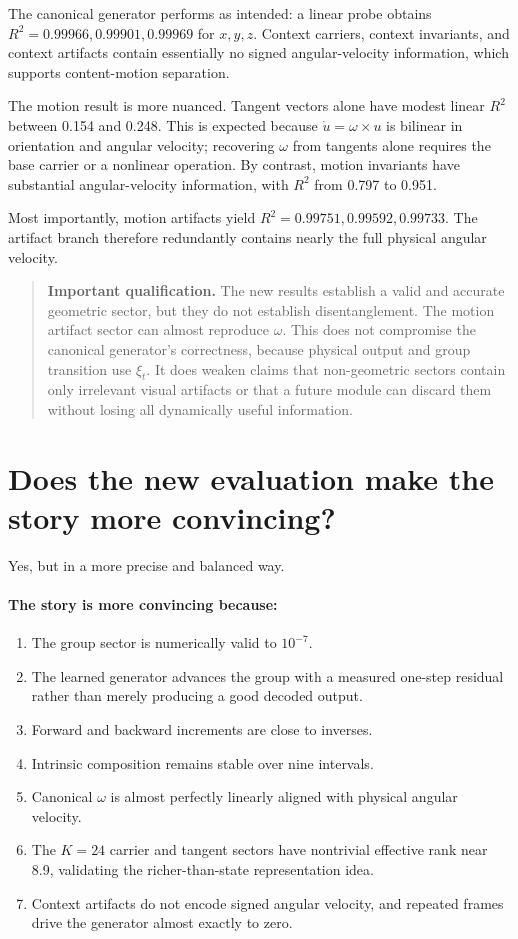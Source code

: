 \documentclass[11pt,a4paper]{article}
\newenvironment{caution}{\begin{quote}\color{reportorange}\textbf{Important qualification.} }{\end{quote}}
\begin{document}
The canonical generator performs as intended: a linear probe obtains $R^2=0.99966,0.99901,0.99969$ for $x,y,z$. Context carriers, context invariants, and context artifacts contain essentially no signed angular-velocity information, which supports content-motion separation.

The motion result is more nuanced. Tangent vectors alone have modest linear $R^2$ between 0.154 and 0.248. This is expected because $\dot u=\omega\times u$ is bilinear in orientation and angular velocity; recovering $\omega$ from tangents alone requires the base carrier or a nonlinear operation. By contrast, motion invariants have substantial angular-velocity information, with $R^2$ from 0.797 to 0.951.

Most importantly, motion artifacts yield $R^2=0.99751,0.99592,0.99733$. The artifact branch therefore redundantly contains nearly the full physical angular velocity.

\begin{caution}
The new results establish a valid and accurate geometric sector, but they do not establish disentanglement. The motion artifact sector can almost reproduce $\omega$. This does not compromise the canonical generator's correctness, because physical output and group transition use $\xi_t$. It does weaken claims that non-geometric sectors contain only irrelevant visual artifacts or that a future module can discard them without losing all dynamically useful information.
\end{caution}

\section{Does the new evaluation make the story more convincing?}
Yes, but in a more precise and balanced way.

\paragraph{The story is more convincing because:}
\begin{enumerate}[leftmargin=*]
\item The group sector is numerically valid to $10^{-7}$.
\item The learned generator advances the group with a measured one-step residual rather than merely producing a good decoded output.
\item Forward and backward increments are close to inverses.
\item Intrinsic composition remains stable over nine intervals.
\item Canonical $\omega$ is almost perfectly linearly aligned with physical angular velocity.
\item The $K=24$ carrier and tangent sectors have nontrivial effective rank near 8.9, validating the richer-than-state representation idea.
\item Context artifacts do not encode signed angular velocity, and repeated frames drive the generator almost exactly to zero.
\end{enumerate}
\end{document}
